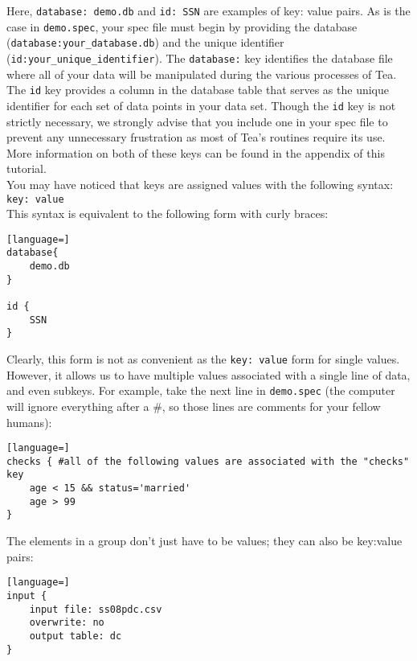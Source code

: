 \documentclass{article}
\begin{document}
Here, {\tt database: demo.db} and {\tt id: SSN} are examples of key: value pairs.
As is the case in {\tt demo.spec}, your spec file must begin by providing the 
database ({\tt database:your\_database.db}) and the unique identifier 
({\tt id:your\_unique\_identifier}). The {\tt database:} key identifies 
the database file where all of your data will be manipulated during the various processes of Tea. 
The {\tt id} key provides a column in the database table that serves as the unique identifier for 
each set of data points in your data set. Though the {\tt id} key is not strictly necessary, 
we strongly advise that you include one in your spec file to prevent any unnecessary frustration 
as most of Tea's routines require its use. More information on both of these keys can be found in 
the appendix of this tutorial.\\

You may have noticed that keys are assigned values with the following syntax:\\

{\tt key: value}\\

This syntax is equivalent to the following form with curly braces:
\begin{lstlisting}[language=]
database{
	demo.db
}

id {
	SSN
}
\end{lstlisting}

Clearly, this form is not as convenient as the {\tt key: value} form for single values. However, it allows 
us to have multiple values associated with a single line of data, and even subkeys. For example, take  
the next line in {\tt demo.spec} (the computer will 
ignore everything after a \#, so those lines are comments for your fellow humans):

\begin{lstlisting}[language=]
checks { #all of the following values are associated with the "checks" key
	age < 15 && status='married'
	age > 99
}
\end{lstlisting}

The elements in a group don't just have to be values; they can also be key:value pairs:

\begin{lstlisting}[language=]
input { 
    input file: ss08pdc.csv
    overwrite: no
    output table: dc
}
\end{lstlisting}

\end{document}
